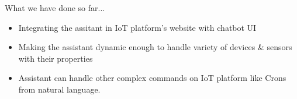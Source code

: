 \documentclass[10pt, a4paper]{beamer}
\begin{document}
\begin{frame}{What we have done so far...}
	\begin{minipage}[b]{0.55\textwidth}
		\raggedright
		\begin{itemize}
			\item Integrating the assitant in IoT platform's website with chatbot UI
			\newline\\\vspace{0.2cm}
			\item Making the assistant dynamic enough to handle variety of devices \& sensors with their properties
			\newline\\\vspace{0.2cm}
			\item Assistant can handle other complex commands on IoT platform like Crons from natural language.
		\end{itemize}
		\vspace{0.3cm}
	\end{minipage}%
	\begin{minipage}[b]{0.45\textwidth}
		\centering

\end{minipage}
\end{frame}
\end{document}
